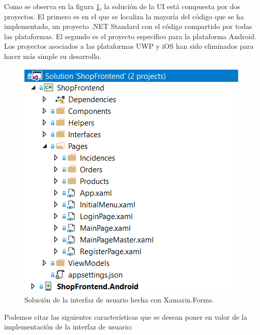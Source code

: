 \documentclass[11pt,spanish,listoffigures]{tfgetsinf}
\begin{document}
Como se observa en la figura \ref{fig:ShopFrontEnd}, la solución de la UI está compuesta por dos proyectos. El primero es en el que se localiza la mayoría del código que se ha implementado, un proyecto .NET Standard con el código compartido por todas las plataformas. El segundo es el proyecto específico para la plataforma Android. Los proyectos asociados a las plataformas UWP y iOS han sido eliminados para hacer más simple su desarrollo.

\begin{figure}[h]
\centering
\includegraphics[scale=0.8]{ShopFrontEnd}
\caption{Solución de la interfaz de usuario hecha con Xamarin.Forms.}
\label{fig:ShopFrontEnd}
\end{figure}

Podemos citar las siguientes características que se desean poner en valor de la implementación de la interfaz de usuario:
\end{document}
